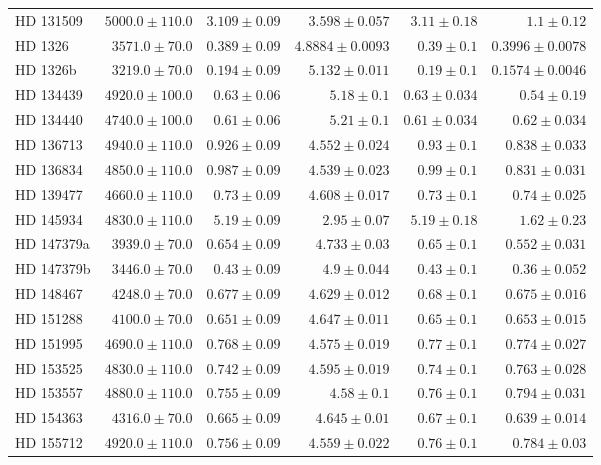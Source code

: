 \begin{longtable*}{lrrrrr}
HD 131509 & $5000.0\pm 110.0$ & $3.109\pm 0.09$ & $3.598\pm 0.057$ & $3.11\pm 0.18$ & $1.1\pm 0.12$ \\ 
HD 1326 & $3571.0\pm 70.0$ & $0.389\pm 0.09$ & $4.8884\pm 0.0093$ & $0.39\pm 0.1$ & $0.3996\pm 0.0078$ \\ 
HD 1326b & $3219.0\pm 70.0$ & $0.194\pm 0.09$ & $5.132\pm 0.011$ & $0.19\pm 0.1$ & $0.1574\pm 0.0046$ \\ 
HD 134439 & $4920.0\pm 100.0$ & $0.63\pm 0.06$ & $5.18\pm 0.1$ & $0.63\pm 0.034$ & $0.54\pm 0.19$ \\ 
HD 134440 & $4740.0\pm 100.0$ & $0.61\pm 0.06$ & $5.21\pm 0.1$ & $0.61\pm 0.034$ & $0.62\pm 0.034$ \\ 
HD 136713 & $4940.0\pm 110.0$ & $0.926\pm 0.09$ & $4.552\pm 0.024$ & $0.93\pm 0.1$ & $0.838\pm 0.033$ \\ 
HD 136834 & $4850.0\pm 110.0$ & $0.987\pm 0.09$ & $4.539\pm 0.023$ & $0.99\pm 0.1$ & $0.831\pm 0.031$ \\ 
HD 139477 & $4660.0\pm 110.0$ & $0.73\pm 0.09$ & $4.608\pm 0.017$ & $0.73\pm 0.1$ & $0.74\pm 0.025$ \\ 
HD 145934 & $4830.0\pm 110.0$ & $5.19\pm 0.09$ & $2.95\pm 0.07$ & $5.19\pm 0.18$ & $1.62\pm 0.23$ \\ 
HD 147379a & $3939.0\pm 70.0$ & $0.654\pm 0.09$ & $4.733\pm 0.03$ & $0.65\pm 0.1$ & $0.552\pm 0.031$ \\ 
HD 147379b & $3446.0\pm 70.0$ & $0.43\pm 0.09$ & $4.9\pm 0.044$ & $0.43\pm 0.1$ & $0.36\pm 0.052$ \\ 
HD 148467 & $4248.0\pm 70.0$ & $0.677\pm 0.09$ & $4.629\pm 0.012$ & $0.68\pm 0.1$ & $0.675\pm 0.016$ \\ 
HD 151288 & $4100.0\pm 70.0$ & $0.651\pm 0.09$ & $4.647\pm 0.011$ & $0.65\pm 0.1$ & $0.653\pm 0.015$ \\ 
HD 151995 & $4690.0\pm 110.0$ & $0.768\pm 0.09$ & $4.575\pm 0.019$ & $0.77\pm 0.1$ & $0.774\pm 0.027$ \\ 
HD 153525 & $4830.0\pm 110.0$ & $0.742\pm 0.09$ & $4.595\pm 0.019$ & $0.74\pm 0.1$ & $0.763\pm 0.028$ \\ 
HD 153557 & $4880.0\pm 110.0$ & $0.755\pm 0.09$ & $4.58\pm 0.1$ & $0.76\pm 0.1$ & $0.794\pm 0.031$ \\ 
HD 154363 & $4316.0\pm 70.0$ & $0.665\pm 0.09$ & $4.645\pm 0.01$ & $0.67\pm 0.1$ & $0.639\pm 0.014$ \\ 
HD 155712 & $4920.0\pm 110.0$ & $0.756\pm 0.09$ & $4.559\pm 0.022$ & $0.76\pm 0.1$ & $0.784\pm 0.03$ \\ 

\end{longtable*}
